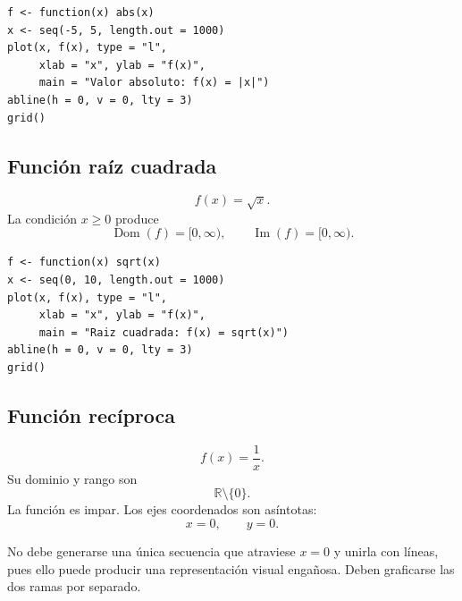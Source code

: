 \documentclass[12pt]{article}
\theoremstyle{remark}
\newcommand{\R}{\mathbb{R}}
\newcommand{\Dom}{\operatorname{Dom}}
\newcommand{\Ima}{\operatorname{Im}}
\begin{document}
\begin{verbatim}
f <- function(x) abs(x)
x <- seq(-5, 5, length.out = 1000)
plot(x, f(x), type = "l",
     xlab = "x", ylab = "f(x)",
     main = "Valor absoluto: f(x) = |x|")
abline(h = 0, v = 0, lty = 3)
grid()
\end{verbatim}

\subsection*{Función raíz cuadrada}

\[
f(x)=\sqrt{x}.
\]
La condición $x\geq0$ produce
\[
\Dom(f)=[0,\infty),\qquad \Ima(f)=[0,\infty).
\]

\begin{center}
\end{center}

\begin{verbatim}
f <- function(x) sqrt(x)
x <- seq(0, 10, length.out = 1000)
plot(x, f(x), type = "l",
     xlab = "x", ylab = "f(x)",
     main = "Raiz cuadrada: f(x) = sqrt(x)")
abline(h = 0, v = 0, lty = 3)
grid()
\end{verbatim}

\subsection*{Función recíproca}

\[
f(x)=\frac{1}{x}.
\]
Su dominio y rango son
\[
\R\setminus\{0\}.
\]
La función es impar. Los ejes coordenados son asíntotas:
\[
x=0,\qquad y=0.
\]

No debe generarse una única secuencia que atraviese $x=0$ y unirla con líneas,
pues ello puede producir una representación visual engañosa. Deben graficarse
las dos ramas por separado.

\begin{center}
\end{center}
\end{document}
